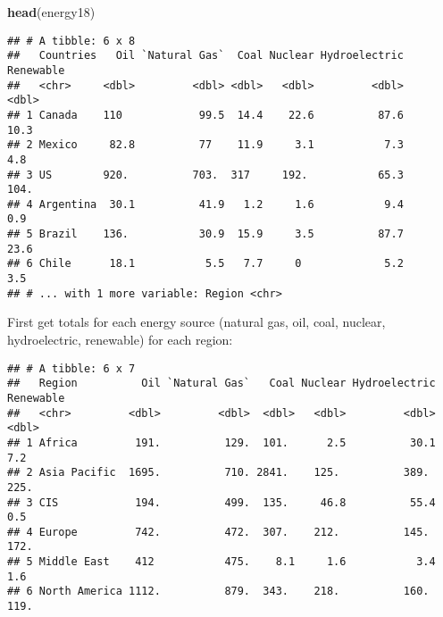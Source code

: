 \documentclass[]{book}
\newenvironment{Shaded}{\begin{snugshade}}{\end{snugshade}}
\newcommand{\DataTypeTok}[1]{\textcolor[rgb]{0.13,0.29,0.53}{#1}}
\newcommand{\KeywordTok}[1]{\textcolor[rgb]{0.13,0.29,0.53}{\textbf{#1}}}
\newcommand{\NormalTok}[1]{#1}
\newcommand{\OperatorTok}[1]{\textcolor[rgb]{0.81,0.36,0.00}{\textbf{#1}}}
\newcommand{\StringTok}[1]{\textcolor[rgb]{0.31,0.60,0.02}{#1}}
\begin{document}
\begin{Shaded}
\begin{Highlighting}[]
\KeywordTok{head}\NormalTok{(energy18)}
\end{Highlighting}
\end{Shaded}

\begin{verbatim}
## # A tibble: 6 x 8
##   Countries   Oil `Natural Gas`  Coal Nuclear Hydroelectric Renewable
##   <chr>     <dbl>         <dbl> <dbl>   <dbl>         <dbl>     <dbl>
## 1 Canada    110            99.5  14.4    22.6          87.6      10.3
## 2 Mexico     82.8          77    11.9     3.1           7.3       4.8
## 3 US        920.          703.  317     192.           65.3     104. 
## 4 Argentina  30.1          41.9   1.2     1.6           9.4       0.9
## 5 Brazil    136.           30.9  15.9     3.5          87.7      23.6
## 6 Chile      18.1           5.5   7.7     0             5.2       3.5
## # ... with 1 more variable: Region <chr>
\end{verbatim}

First get totals for each energy source (natural gas, oil, coal, nuclear, hydroelectric, renewable) for each region:

\begin{Shaded}
\end{Shaded}

\begin{verbatim}
## # A tibble: 6 x 7
##   Region          Oil `Natural Gas`   Coal Nuclear Hydroelectric Renewable
##   <chr>         <dbl>         <dbl>  <dbl>   <dbl>         <dbl>     <dbl>
## 1 Africa         191.          129.  101.      2.5          30.1       7.2
## 2 Asia Pacific  1695.          710. 2841.    125.          389.      225. 
## 3 CIS            194.          499.  135.     46.8          55.4       0.5
## 4 Europe         742.          472.  307.    212.          145.      172. 
## 5 Middle East    412           475.    8.1     1.6           3.4       1.6
## 6 North America 1112.          879.  343.    218.          160.      119.
\end{verbatim}
\end{document}
